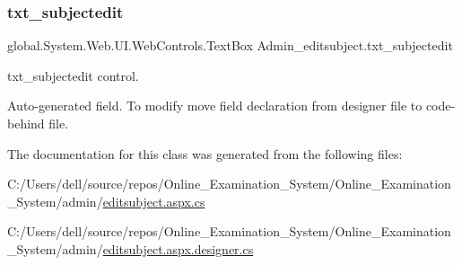 \subsubsection{\texorpdfstring{txt\_subjectedit}{txt\_subjectedit}}
{\footnotesize\ttfamily global.\+System.\+Web.\+U\+I.\+Web\+Controls.\+Text\+Box Admin\+\_\+editsubject.\+txt\+\_\+subjectedit\hspace{0.3cm}{\ttfamily [protected]}}



txt\+\_\+subjectedit control. 

Auto-\/generated field. To modify move field declaration from designer file to code-\/behind file. 

The documentation for this class was generated from the following files\+:\begin{DoxyCompactItemize}
\item 
C\+:/\+Users/dell/source/repos/\+Online\+\_\+\+Examination\+\_\+\+System/\+Online\+\_\+\+Examination\+\_\+\+System/admin/\mbox{\hyperlink{editsubject_8aspx_8cs}{editsubject.\+aspx.\+cs}}\item 
C\+:/\+Users/dell/source/repos/\+Online\+\_\+\+Examination\+\_\+\+System/\+Online\+\_\+\+Examination\+\_\+\+System/admin/\mbox{\hyperlink{editsubject_8aspx_8designer_8cs}{editsubject.\+aspx.\+designer.\+cs}}\end{DoxyCompactItemize}
